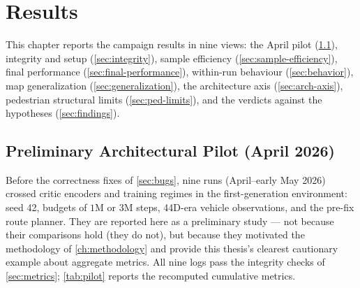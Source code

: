 \chapter{Results}
\label{ch:results}

This chapter reports the campaign results in nine views: the April
pilot (\cref{sec:pilot}), integrity and setup (\cref{sec:integrity}),
sample efficiency (\cref{sec:sample-efficiency}), final performance
(\cref{sec:final-performance}), within-run behaviour
(\cref{sec:behavior}), map generalization
(\cref{sec:generalization}), the architecture axis
(\cref{sec:arch-axis}), pedestrian structural limits
(\cref{sec:ped-limits}), and the verdicts against the hypotheses
(\cref{sec:findings}).

\section{Preliminary Architectural Pilot (April 2026)}
\label{sec:pilot}

Before the correctness fixes of \cref{sec:bugs}, nine runs (April--early
May 2026) crossed critic encoders and training regimes in the
first-generation environment: seed 42, budgets of $1$M or $3$M steps,
44D-era vehicle observations, and the pre-fix route planner. They are
reported here as a preliminary study --- not because their comparisons
hold (they do not), but because they motivated the methodology of
\cref{ch:methodology} and provide this thesis's clearest cautionary
example about aggregate metrics. All nine logs pass the integrity checks
of \cref{sec:metrics}; \cref{tab:pilot} reports the recomputed
cumulative metrics.

